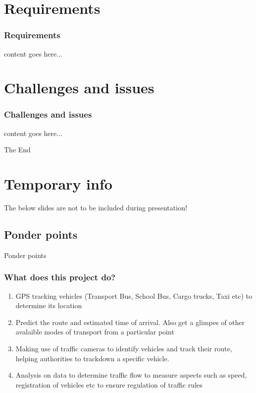 \documentclass{beamer}
\begin{document}
\section{Requirements}
\begin{frame}
	\frametitle{Requirements}
	content goes here...
\end{frame}


\section{Challenges and issues}
\begin{frame}
	\frametitle{Challenges and issues}
	content goes here...
\end{frame}


\begin{frame}
	\Huge{\centerline{The End}}
\end{frame}

\section{Temporary info}
\begin{frame}
	The below slides are not to be included during presentation! 
\end{frame}

\subsection{Ponder points}
\begin{frame}
	\Huge{\centerline{Ponder points}}
\end{frame}

\begin{frame}
	\frametitle{What does this project do?}
	\begin{enumerate}
		\item GPS tracking vehicles (Transport Bus, School Bus, Cargo trucks, Taxi etc) to determine its location
		\item Predict the route and estimated time of arrival. Also get a glimpes of other avalaible modes of transport from a particular point
		\item Making use of traffic cameras to identify vehicles and track their route, helping authorities to trackdown a specific vehicle.
		\item Analysis on data to determine traffic flow to measure aspects such as speed, registration of vehicles etc to ensure regulation of traffic rules
	\end{enumerate}
\end{frame}
\end{document}
